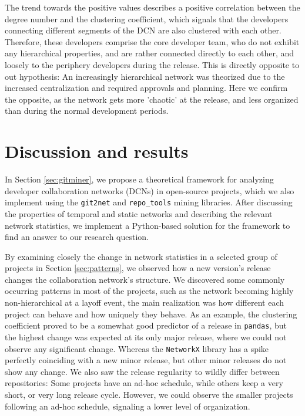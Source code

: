 The trend towards the positive values describes a positive correlation between the degree number and the clustering coefficient, which signals that the developers connecting different segments of the DCN are also clustered with each other. Therefore, these developers comprise the core developer team, who do not exhibit any hierarchical properties, and are rather connected directly to each other, and loosely to the periphery developers during the release. This is directly opposite to out hypothesis: An increasingly hierarchical network was theorized due to the increased centralization and required approvals and planning. Here we confirm the opposite, as the network gets more 'chaotic' at the release, and less organized than during the normal development periods.

\section{Discussion and results}

In Section \ref{sec:gitminer}, we propose a theoretical framework for analyzing developer collaboration networks (DCNs) in open-source projects, which we also implement using the \texttt{git2net} and \texttt{repo\_tools} mining libraries. After discussing the properties of temporal and static networks and describing the relevant network statistics, we implement a Python-based solution for the framework to find an answer to our research question.

By examining closely the change in network statistics in a selected group of projects in Section \ref{sec:patterns}, we observed how a new version's release changes the collaboration network's structure. We  discovered some commonly occurring patterns in most of the projects, such as the network becoming highly non-hierarchical at a layoff event, the main realization was how different each project can behave and how uniquely they behave. As an example, the clustering coefficient proved to be a somewhat good predictor of a release in \texttt{pandas}, but the highest change was expected at its only major release, where we could not observe any significant change. Whereas the \texttt{NetworkX} library has a spike perfectly coinciding with a new minor release, but other minor releases do not show any change. We also saw the release regularity to wildly differ between repositories: Some projects have an ad-hoc schedule, while others keep a very short, or very long release cycle. However, we could observe the smaller projects following an ad-hoc schedule, signaling a lower level of organization.

